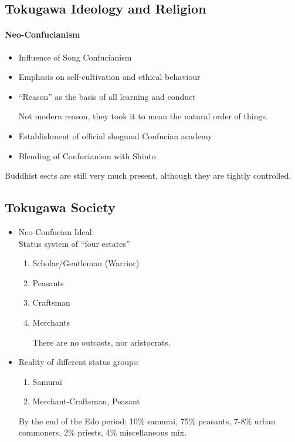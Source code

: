 \documentclass[class=article, crop=false]{standalone}
\begin{document}
  \subsection{Tokugawa Ideology and Religion}
  \paragraph{Neo-Confucianism}
  \begin{itemize}
    \item Influence of Song Confucianism
    \item Emphasis on self-cultivation and ethical behaviour
    \item ``Reason'' as the basis of all learning and conduct
    \begin{note}{}
      Not modern reason, they took it to mean the natural order of things.
    \end{note}
    \item Establishment of official shogunal Confucian academy
    \item Blending of Confucianism with Shinto
  \end{itemize}
  \begin{note}{}
    Buddhist sects are still very much present, although they are tightly controlled.
  \end{note}
  \subsection{Tokugawa Society}
  \begin{itemize}
    \item Neo-Confucian Ideal: \\
    Status system of ``four estates''
    \begin{enumerate}
      \item Scholar/Gentleman (Warrior)
      \item Peasants
      \item Craftsman
      \item Merchants
      \begin{note}{}
        There are no outcasts, nor aristocrats.
      \end{note}
    \end{enumerate}
    \item Reality of different status groups:
    \begin{enumerate}
      \item Samurai
      \item Merchant-Craftsman, Peasant
    \end{enumerate}
    \begin{note}{}
      By the end of the Edo period: 10\% samurai, 75\% peasants, 7-8\% urban commoners, 2\% priests, 4\% miscellaneous mix.
    \end{note}
  \end{itemize}
\end{document}
